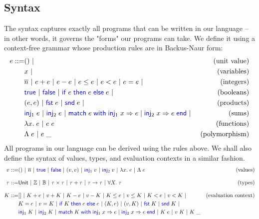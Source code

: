 \documentclass[twoside,11pt,openright]{report}
\theoremstyle{definition}
\newcommand{\BNFdef}{::=}
\newcommand{\ALT}{~|~}
\newcommand{\Keyword}[1]{{\color{blue} \mathsf{#1}}}
\newcommand{\var}{x}
\newcommand{\expr}{e}
\newcommand{\val}{v}
\newcommand{\TT}{()}
\newcommand{\Num}[1]{\overline{#1}}
\newcommand{\True}{\Keyword{true}}
\newcommand{\False}{\Keyword{false}}
\newcommand{\IfCmd}{\Keyword{if}}
\newcommand{\ThenCmd}{\Keyword{then}}
\newcommand{\ElseCmd}{\Keyword{else}}
\def\If#1then#2else#3{\IfCmd{}\;#1\;\ThenCmd{}\;#2\;\ElseCmd{}\;#3}
\newcommand{\Fst}{\Keyword{fst}\;}
\newcommand{\Snd}{\Keyword{snd}\;}
\newcommand{\Inj}[1]{\Keyword{inj}_{#1}\;}
\newcommand{\MatchCmd}{\Keyword{match}}
\newcommand{\WithCmd}{\Keyword{with}}
\newcommand{\EndCmd}{\Keyword{end}}
\def\Match#1with#2=>#3|#4=>#5end{\MatchCmd{}\;#1\;\WithCmd{}\;#2\Rightarrow#3 \;|\;#4\Rightarrow#5\;\EndCmd{}}
\newcommand{\Tvar}{X}
\newcommand{\Tlam}{\Lambda\;}
\newcommand{\Tapp}[1]{#1\;\_}
\newcommand{\empelctx}{[]}
\newcommand{\elctx}{K}
\newcommand{\Tunit}{\mathsf{Unit}}
\newcommand{\Tint}{\mathbb{Z}}
\newcommand{\Tbool}{\mathbb{B}}
\newcommand{\Tprod}[2]{#1 \times #2}
\newcommand{\Tsum}[2]{#1 + #2}
\newcommand{\Tfunc}[2]{#1 \rightarrow #2}
\newcommand{\Tall}[2]{\forall #1.\; #2}
\newcommand{\typ}{\tau}
\begin{document}
\subsection{Syntax}
The syntax captures exactly all programs that can be written in our language – in other words, it governs the "forms" our programs can take. We define it using a context-free grammar whose production rules are in Backus-Naur form:
\begin{align*}
  \expr \BNFdef & \TT \ALT & \text{(unit value)}\\
                & \var \ALT & \text{(variables)}\\
                & \Num{n} \ALT \expr + \expr \ALT \expr - \expr \ALT
                  \expr \le \expr \ALT \expr < \expr \ALT 
                  \expr = \expr \ALT & \text{(integers)}\\
                & \True \ALT \False \ALT {\If \expr then \expr else \expr} \ALT
                  & \text{(booleans)}\\
                & (\expr, \expr) \ALT \Fst \expr \ALT \Snd \expr \ALT
                  & \text{(products)}\\
                & \Inj{1} \expr \ALT \Inj{2} \expr \ALT 
                  \Match \expr with \Inj{1} \var => \expr | \Inj{2} \var => \expr end \ALT
                  & \text{(sums)}\\
                & \fun \var . \expr \ALT \expr \; \expr
                  & \text{(functions)}\\
                & \Tlam \expr \ALT \Tapp{\expr} & \text{(polymorphism)}
\end{align*}
All programs in our language can be derived using the rules above. We shall also define the syntax of values, types, and evaluation contexts in a similar fashion.
\begin{align*}
  \val \BNFdef  & \TT \ALT \Num{n} \ALT \True \ALT \False \ALT
                  (\val, \val) \ALT \Inj{1} \val \ALT \Inj{2} \val \ALT
                  \fun \var . \expr \ALT \Tlam \expr
                  & \text{(values)}\\[8pt]
  \typ \BNFdef  & \Tunit \ALT \Tint \ALT \Tbool \ALT {\Tprod \typ \typ} \ALT
                  {\Tsum \typ \typ} \ALT {\Tfunc \typ \typ} \ALT 
                  {\Tall \Tvar \typ} & \text{(types)}\\[8pt]
  \elctx \BNFdef& \empelctx \ALT 
                  \elctx + \expr \ALT \val + \elctx \ALT
                  \elctx - \expr \ALT \val - \elctx \ALT
                  \elctx \le \expr \ALT \val \le \elctx \ALT
                  \elctx < \expr \ALT \val < \elctx \ALT 
                  & \text{(evaluation context)}\\
                & \elctx = \expr \ALT \val = \elctx \ALT
                  {\If \elctx then \expr else \expr} \ALT
                  (\elctx, \expr) \ALT (\val, \elctx) \ALT
                  \Fst \elctx \ALT \Snd \elctx \ALT\\
                & \Inj{1} \elctx \ALT \Inj{2} \elctx \ALT
                  \Match \elctx with \Inj{1} \var => \expr | \Inj{2} \var => \expr end \ALT
                  \elctx \; \expr \ALT \val \; \elctx \ALT \Tapp{\elctx}
\end{align*}
\end{document}
